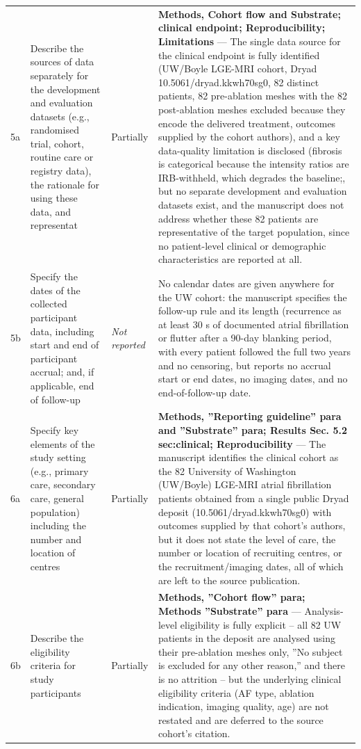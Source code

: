 \documentclass[10pt]{article}
\begin{document}
\begin{longtable}{@{}p{0.9cm} p{6.2cm} p{1.9cm} p{12.4cm}@{}}
5a & Describe the sources of data separately for the development and evaluation datasets (e.g., randomised trial, cohort, routine care or registry data), the rationale for using these data, and representat & Partially & \textbf{Methods, Cohort flow and Substrate; clinical endpoint; Reproducibility; Limitations} --- The single data source for the clinical endpoint is fully identified (UW/Boyle LGE-MRI cohort, Dryad 10.5061/dryad.kkwh70sg0, 82 distinct patients, 82 pre-ablation meshes with the 82 post-ablation meshes excluded because they encode the delivered treatment, outcomes supplied by the cohort authors), and a key data-quality limitation is disclosed (fibrosis is categorical because the intensity ratios are IRB-withheld, which degrades the baseline;, but no separate development and evaluation datasets exist, and the manuscript does not address whether these 82 patients are representative of the target population, since no patient-level clinical or demographic characteristics are reported at all. \\[2pt]
5b & Specify the dates of the collected participant data, including start and end of participant accrual; and, if applicable, end of follow-up & \emph{Not reported} & No calendar dates are given anywhere for the UW cohort: the manuscript specifies the follow-up rule and its length (recurrence as at least 30 s of documented atrial fibrillation or flutter after a 90-day blanking period, with every patient followed the full two years and no censoring, but reports no accrual start or end dates, no imaging dates, and no end-of-follow-up date. \\[2pt]
6a & Specify key elements of the study setting (e.g., primary care, secondary care, general population) including the number and location of centres & Partially & \textbf{Methods, ''Reporting guideline'' para and ''Substrate'' para; Results Sec. 5.2 sec:clinical; Reproducibility} --- The manuscript identifies the clinical cohort as the 82 University of Washington (UW/Boyle) LGE-MRI atrial fibrillation patients obtained from a single public Dryad deposit (10.5061/dryad.kkwh70sg0) with outcomes supplied by that cohort's authors, but it does not state the level of care, the number or location of recruiting centres, or the recruitment/imaging dates, all of which are left to the source publication. \\[2pt]
6b & Describe the eligibility criteria for study participants & Partially & \textbf{Methods, ''Cohort flow'' para; Methods ''Substrate'' para} --- Analysis-level eligibility is fully explicit -- all 82 UW patients in the deposit are analysed using their pre-ablation meshes only, ''No subject is excluded for any other reason,'' and there is no attrition -- but the underlying clinical eligibility criteria (AF type, ablation indication, imaging quality, age) are not restated and are deferred to the source cohort's citation. \\[2pt]

\end{longtable}
\end{document}
